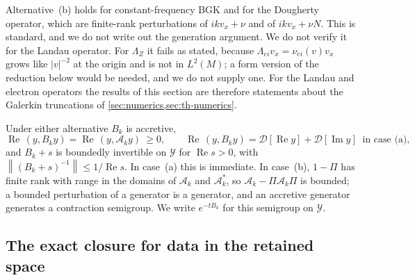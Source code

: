 \documentclass[11pt]{article}
\newcommand{\D}{\mathcal D}
\newcommand{\A}{\mathcal A}
\newcommand{\Real}{\operatorname{Re}}
\newcommand{\Imag}{\operatorname{Im}}
\newcommand{\norm}[1]{\left\|#1\right\|}
\theoremstyle{definition}
\theoremstyle{remark}
\numberwithin{equation}{section}
\begin{document}
Alternative~(b) holds for constant-frequency BGK and for the Dougherty
operator, which are finite-rank perturbations of $ikv_x+\nu$ and of
$ikv_x+\nu N$. This is standard, and we do not write out the
generation argument. We do not verify it for the Landau operator. For
$\Lambda_Z$ it fails as stated, because
$\Lambda_{ei}v_x=\nu_{ei}(v)v_x$ grows like $|v|^{-2}$ at the origin and is
not in $L^2(M)$; a form version of the reduction below would be needed,
and we do not supply one. For the Landau and electron operators the
results of this section are therefore statements about the Galerkin
truncations of \cref{sec:numerics,sec:th-numerics}.

Under either alternative $B_k$ is accretive,
\begin{equation}
 \Real\,(y,B_ky)=\Real\,(y,\A_ky)\ \geq0,\qquad
 \Real\,(y,B_ky)=\D[\Real y]+\D[\Imag y]\ \text{ in case (a)},
 \label{eq:mem-accretive}
\end{equation}
and $B_k+s$ is boundedly invertible on $\mathcal Y$ for $\Real s>0$, with
$\norm{(B_k+s)^{-1}}\leq1/\Real s$. In case~(a) this is immediate. In
case~(b), $1-\Pi$ has finite rank with range in the domains of $\A_k$ and
$\A_k^*$, so $\A_k-\Pi\A_k\Pi$ is bounded; a bounded perturbation of a
generator is a generator, and an accretive generator generates a
contraction semigroup. We write $e^{-tB_k}$ for this semigroup on
$\mathcal Y$.

\subsection{The exact closure for data in the retained space}
\end{document}
